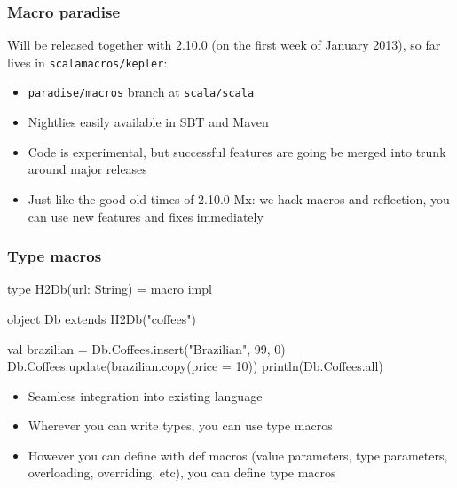 \documentclass[svgnames,hyperref={bookmarks=false}]{beamer}
\begin{document}
\begin{frame}[fragile]
\frametitle{Macro paradise}

Will be released together with 2.10.0 (on the first week of January 2013), so far lives in \texttt{scalamacros/kepler}:

\begin{itemize}
\item \texttt{paradise/macros} branch at \texttt{scala/scala}
\item Nightlies easily available in SBT and Maven
\item Code is experimental, but successful features are going be merged into trunk around major releases
\item Just like the good old times of 2.10.0-Mx: we hack macros and reflection, you can use new features and fixes immediately
\end{itemize}
\end{frame}

\begin{frame}[fragile]
\frametitle{}

\vskip40pt
\begin{center}
\end{center}
\end{frame}

\begin{frame}[fragile]
\frametitle{Type macros}
\begin{semiverbatim}
type H2Db(url: String) = macro impl

object Db extends H2Db("coffees")

val brazilian = Db.Coffees.insert("Brazilian", 99, 0)
Db.Coffees.update(brazilian.copy(price = 10))
println(Db.Coffees.all)
\end{semiverbatim}

\vskip15pt

\begin{itemize}
\item Seamless integration into existing language
\item Wherever you can write types, you can use type macros
\item However you can define with def macros (value parameters, type parameters, overloading, overriding, etc), you can define type macros
\end{itemize}
\end{frame}
\end{document}
